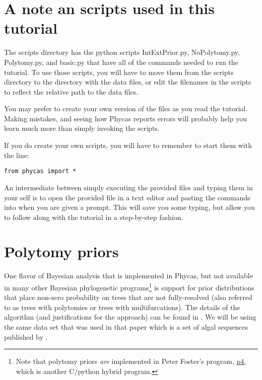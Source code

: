 \documentclass{article}
\newcommand{\cmd}[1]{\texttt{#1}\xspace}
\newcommand{\phycas}{Phycas\xspace}
\newcommand{\localfile}[1]{\textsf{#1}\xspace}
\begin{document}


\section{A note an scripts used in this tutorial}
The \localfile{scripts} directory has the python
scripts \localfile{IntExtPrior.py}, \localfile{NoPolytomy.py},
\localfile{Polytomy.py}, and \localfile{basic.py}
that have all of the commands needed to run the tutorial.
To use those scripts, you will have to move them
from the \localfile{scripts} directory to the directory
with the data files, or edit the
filenames in the scripts to reflect the relative 
path to the data files.

You may prefer to create your own version of the
files as you read the tutorial.
Making mistakes, and seeing how \phycas reports
errors will probably help you learn much more 
than simply invoking the scripts.

If you do create your own scripts, you will have to remember
to start them with the line:
\begin{verbatim}
from phycas import *
\end{verbatim}

An intermediate between simply executing the provided files
and typing them in your self is to open the provided file in
a text editor and pasting the commands into when you are given 
a prompt.
This will save you some typing, but allow you to follow 
along with the tutorial in a step-by-step fashion.

\section{Polytomy priors}

One flavor of Bayesian analysis that is implemented in \phycas, but not available in many other Bayesian phylogenetic programs\footnote{Note that polytomy priors {\em are} implemented in Peter Foster's program, \href{http://bmnh.org/~pf/p4.html}{p4}, which is another C/python hybrid program.} is support for prior distributions that place non-zero probability on trees that are not fully-resolved (also referred to as trees with polytomies or trees with multifurcations).
The details of the algorithm (and justifications for the approach) can be found in \citet{LewisHolderHolsinger2005}.
We will be using the same data set that was used in that paper which is a set of algal sequences published by \citet{ShoupL2003}.
\end{document}
